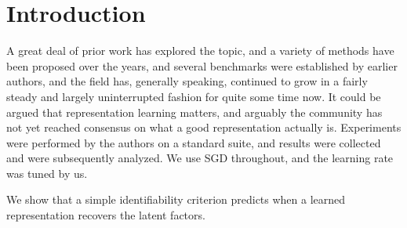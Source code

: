\section{Introduction}

A great deal of prior work has explored the topic, and a variety of methods
have been proposed over the years, and several benchmarks were established by
earlier authors, and the field has, generally speaking, continued to grow in a
fairly steady and largely uninterrupted fashion for quite some time now. It
could be argued that representation learning matters, and arguably the
community has not yet reached consensus on what a good representation actually
is. Experiments were performed by the authors on a standard suite, and results
were collected and were subsequently analyzed. We use SGD throughout, and the
learning rate was tuned by us.

We show that a simple identifiability criterion predicts when a learned
representation recovers the latent factors.
